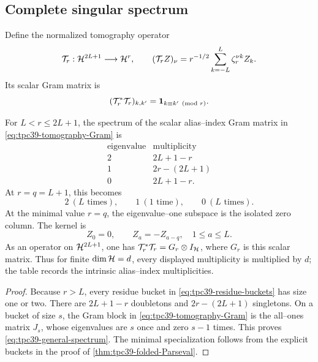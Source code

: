 \subsection{Complete singular spectrum}

Define the normalized tomography operator
\begin{equation}
 \mathcal T_r:\mathcal H^{2L+1}\longrightarrow\mathcal H^r,
 \qquad
 (\mathcal T_rZ)_\nu
 =r^{-1/2}\sum_{k=-L}^{L}\zeta_r^{\nu k}Z_k.
 \label{eq:tpc39-tomography-operator}
\end{equation}
Its scalar Gram matrix is
\begin{equation}
 (\mathcal T_r^*\mathcal T_r)_{k,k'}
 =\mathbf 1_{k\equiv k'\pmod r}.
 \label{eq:tpc39-tomography-Gram}
\end{equation}

\begin{theorem}
\label{thm:tpc39-tomography-spectrum}
For \(L<r\le2L+1\), the spectrum of the scalar alias--index Gram matrix
in \eqref{eq:tpc39-tomography-Gram} is
\begin{equation}
 \boxed{
 \begin{array}{c|c}
 \text{eigenvalue}&\text{multiplicity}\\ \hline
 2&2L+1-r\\
 1&2r-(2L+1)\\
 0&2L+1-r.
 \end{array}}
 \label{eq:tpc39-general-spectrum}
\end{equation}
At \(r=q=L+1\), this becomes
\begin{equation}
 2\ (L\text{ times}),
 \qquad1\ (1\text{ time}),
 \qquad0\ (L\text{ times}).
 \label{eq:tpc39-minimal-spectrum}
\end{equation}
At the minimal value \(r=q\), the eigenvalue--one subspace is the isolated
zero column.  The kernel is
\begin{equation}
 Z_0=0,
 \qquad
 Z_a=-Z_{a-q},
 \quad1\le a\le L.
 \label{eq:tpc39-minimal-kernel}
\end{equation}
As an operator on \(\mathcal H^{2L+1}\), one has
\(\mathcal T_r^*\mathcal T_r=G_r\otimes I_{\mathcal H}\), where \(G_r\) is this scalar
matrix.  Thus for finite \(\dim\mathcal H=d\), every displayed multiplicity is
multiplied by \(d\); the table records the intrinsic alias--index
multiplicities.
\end{theorem}

\begin{proof}
Because \(r>L\), every residue bucket in
\eqref{eq:tpc39-residue-buckets} has size one or two.  There are
\(2L+1-r\) doubletons and \(2r-(2L+1)\) singletons.  On a bucket of size
\(s\), the Gram block in \eqref{eq:tpc39-tomography-Gram} is the
all--ones matrix \(J_s\), whose eigenvalues are \(s\) once and zero
\(s-1\) times.  This proves \eqref{eq:tpc39-general-spectrum}.  The
minimal specialization follows from the explicit buckets in the proof of
\cref{thm:tpc39-folded-Parseval}.
\end{proof}

